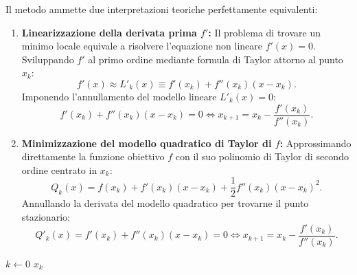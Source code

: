 Il metodo ammette due interpretazioni teoriche perfettamente equivalenti:
\begin{enumerate}
    \item \textbf{Linearizzazione della derivata prima $f'$:}
    Il problema di trovare un minimo locale equivale a risolvere l'equazione non lineare $f'(x) = 0$. Sviluppando $f'$ al primo ordine mediante formula di Taylor attorno al punto $x_k$:
    \begin{equation}
        f'(x) \approx L'_k(x) \equiv f'(x_k) + f''(x_k) (x - x_k).
    \end{equation}
    Imponendo l'annullamento del modello lineare $L'_k(x) = 0$:
    \begin{equation}
        f'(x_k) + f''(x_k) (x - x_k) = 0 \iff x_{k+1} = x_k - \frac{f'(x_k)}{f''(x_k)}.
        \label{eq:newton-step-formula}
    \end{equation}
    \item \textbf{Minimizzazione del modello quadratico di Taylor di $f$:}
    Approssimando direttamente la funzione obiettivo $f$ con il suo polinomio di Taylor di secondo ordine centrato in $x_k$:
    \begin{equation}
        Q_k(x) = f(x_k) + f'(x_k) (x - x_k) + \frac{1}{2} f''(x_k) (x - x_k)^2.
    \end{equation}
    Annullando la derivata del modello quadratico per trovarne il punto stazionario:
    \begin{equation}
        Q'_k(x) = f'(x_k) + f''(x_k) (x - x_k) = 0 \iff x_{k+1} = x_k - \frac{f'(x_k)}{f''(x_k)}.
    \end{equation}
\end{enumerate}

\begin{algorithm}[htbp]
\caption{Metodo di Newton Univariato Puro (\texttt{UNM})}
\label{alg:pure-univariate-newton}
\BlankLine
$k \leftarrow 0$\;
\Return $x_k$\;
\end{algorithm}

